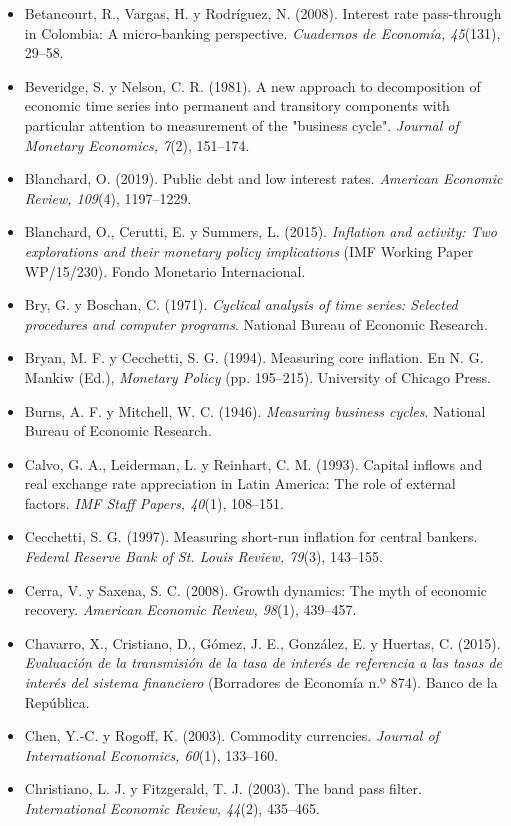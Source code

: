 \begin{itemize}[leftmargin=1.2em,itemindent=-1.2em]
\item[] Betancourt, R., Vargas, H. y Rodríguez, N. (2008). Interest rate pass-through in Colombia: A micro-banking perspective. \emph{Cuadernos de Economía, 45}(131), 29–58.
\item[] Beveridge, S. y Nelson, C. R. (1981). A new approach to decomposition of economic time series into permanent and transitory components with particular attention to measurement of the "business cycle". \emph{Journal of Monetary Economics, 7}(2), 151–174.
\item[] Blanchard, O. (2019). Public debt and low interest rates. \emph{American Economic Review, 109}(4), 1197–1229.
\item[] Blanchard, O., Cerutti, E. y Summers, L. (2015). \emph{Inflation and activity: Two explorations and their monetary policy implications} (IMF Working Paper WP/15/230). Fondo Monetario Internacional.
\item[] Bry, G. y Boschan, C. (1971). \emph{Cyclical analysis of time series: Selected procedures and computer programs}. National Bureau of Economic Research.
\item[] Bryan, M. F. y Cecchetti, S. G. (1994). Measuring core inflation. En N. G. Mankiw (Ed.), \emph{Monetary Policy} (pp. 195–215). University of Chicago Press.
\item[] Burns, A. F. y Mitchell, W. C. (1946). \emph{Measuring business cycles}. National Bureau of Economic Research.
\item[] Calvo, G. A., Leiderman, L. y Reinhart, C. M. (1993). Capital inflows and real exchange rate appreciation in Latin America: The role of external factors. \emph{IMF Staff Papers, 40}(1), 108–151.
\item[] Cecchetti, S. G. (1997). Measuring short-run inflation for central bankers. \emph{Federal Reserve Bank of St. Louis Review, 79}(3), 143–155.
\item[] Cerra, V. y Saxena, S. C. (2008). Growth dynamics: The myth of economic recovery. \emph{American Economic Review, 98}(1), 439–457.
\item[] Chavarro, X., Cristiano, D., Gómez, J. E., González, E. y Huertas, C. (2015). \emph{Evaluación de la transmisión de la tasa de interés de referencia a las tasas de interés del sistema financiero} (Borradores de Economía n.º 874). Banco de la República.
\item[] Chen, Y.-C. y Rogoff, K. (2003). Commodity currencies. \emph{Journal of International Economics, 60}(1), 133–160.
\item[] Christiano, L. J. y Fitzgerald, T. J. (2003). The band pass filter. \emph{International Economic Review, 44}(2), 435–465.

\end{itemize}
